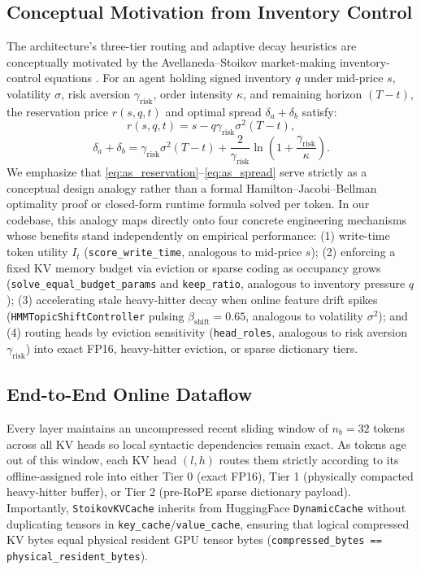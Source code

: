 \documentclass[conference]{IEEEtran}
\begin{document}
\subsection{Conceptual Motivation from Inventory Control}
The architecture's three-tier routing and adaptive decay heuristics are conceptually motivated by the Avellaneda--Stoikov market-making inventory-control equations \cite{b13}. For an agent holding signed inventory $q$ under mid-price $s$, volatility $\sigma$, risk aversion $\gamma_{\text{risk}}$, order intensity $\kappa$, and remaining horizon $(T - t)$, the reservation price $r(s, q, t)$ and optimal spread $\delta_a + \delta_b$ satisfy:
\begin{equation}
r(s, q, t) = s - q \gamma_{\text{risk}} \sigma^2 (T - t),
\label{eq:as_reservation}
\end{equation}
\begin{equation}
\delta_a + \delta_b = \gamma_{\text{risk}} \sigma^2 (T - t) + \frac{2}{\gamma_{\text{risk}}} \ln\!\left(1 + \frac{\gamma_{\text{risk}}}{\kappa}\right).
\label{eq:as_spread}
\end{equation}
We emphasize that \eqref{eq:as_reservation}--\eqref{eq:as_spread} serve strictly as a conceptual design analogy rather than a formal Hamilton--Jacobi--Bellman optimality proof or closed-form runtime formula solved per token. In our codebase, this analogy maps directly onto four concrete engineering mechanisms whose benefits stand independently on empirical performance: (1) write-time token utility $I_t$ (\texttt{score\_write\_time}, analogous to mid-price $s$); (2) enforcing a fixed KV memory budget via eviction or sparse coding as occupancy grows (\texttt{solve\_equal\_budget\_params} and \texttt{keep\_ratio}, analogous to inventory pressure $q$); (3) accelerating stale heavy-hitter decay when online feature drift spikes (\texttt{HMMTopicShiftController} pulsing $\beta_{\text{shift}} = 0.65$, analogous to volatility $\sigma^2$); and (4) routing heads by eviction sensitivity (\texttt{head\_roles}, analogous to risk aversion $\gamma_{\text{risk}}$) into exact FP16, heavy-hitter eviction, or sparse dictionary tiers.

\subsection{End-to-End Online Dataflow}
Every layer maintains an uncompressed recent sliding window of $n_b = 32$ tokens across all KV heads so local syntactic dependencies remain exact. As tokens age out of this window, each KV head $(l, h)$ routes them strictly according to its offline-assigned role into either Tier 0 (exact FP16), Tier 1 (physically compacted heavy-hitter buffer), or Tier 2 (pre-RoPE sparse dictionary payload). Importantly, \texttt{StoikovKVCache} inherits from HuggingFace \texttt{DynamicCache} without duplicating tensors in \texttt{key\_cache}/\texttt{value\_cache}, ensuring that logical compressed KV bytes equal physical resident GPU tensor bytes (\texttt{compressed\_bytes == physical\_resident\_bytes}).
\end{document}
